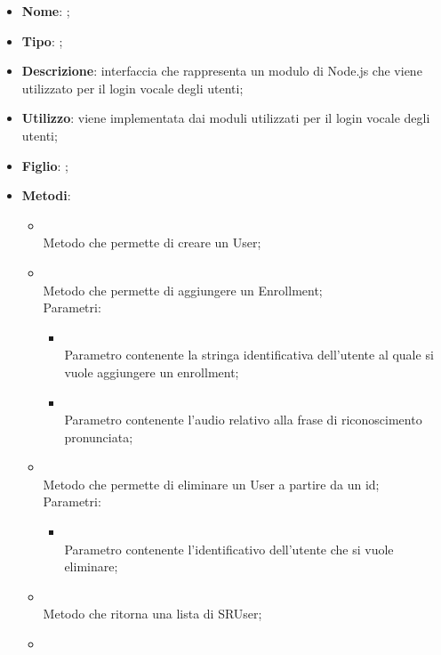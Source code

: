 \begin{itemize}
	\item \textbf{Nome}: ;
	\item \textbf{Tipo}: ;
	\item \textbf{Descrizione}: interfaccia che rappresenta un modulo di Node.js che viene utilizzato per il login vocale degli utenti;
	\item \textbf{Utilizzo}: viene implementata dai moduli utilizzati per il login vocale degli utenti;
	\item \textbf{Figlio}: ;
	\item \textbf{Metodi}:
	\begin{itemize}
		\item[]  \\
		Metodo che permette di creare un User;\\
		\item[]  \\
		Metodo che permette di aggiungere un Enrollment;\\
		Parametri:
		\begin{itemize}
			\item {} \\
			Parametro contenente la stringa identificativa dell'utente al quale si vuole aggiungere un enrollment;
			\item {} \\
			Parametro contenente l'audio relativo alla frase di riconoscimento pronunciata;
		\end{itemize}
		\item[]  \\
		Metodo che permette di eliminare un User a partire da un id;\\
		Parametri:
		\begin{itemize}
			\item {} \\
			Parametro contenente l'identificativo dell'utente che si vuole eliminare;
		\end{itemize}
		\item[]  \\
		Metodo che ritorna una lista di SRUser;\\
		\item[]  \\

\end{itemize}
\end{itemize}
